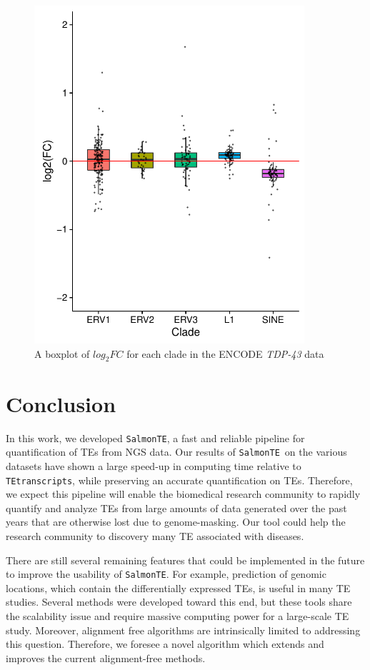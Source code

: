 \documentclass[wsdraft]{ws-procs11x85}
\newcommand{\TEtranscripts}{\texttt{TEtranscripts}}
\newcommand{\SalmonTE}{\texttt{SalmonTE}}
\begin{document}
\begin{figure}[h]
\centerline{
\includegraphics[width=10cm]{boxplot-clade-k562}
}
\caption{A boxplot of $log_{2}FC$ for each clade in the ENCODE \textit{TDP-43} data}
\label{aba:fig5}
\end{figure}

\section{Conclusion}


In this work, we developed \SalmonTE, a fast and reliable pipeline for quantification of TEs from 
NGS data.
Our results of \SalmonTE~on the various datasets have shown a large speed-up in computing time relative to \TEtranscripts, 
while preserving an accurate quantification on TEs. 
Therefore, we expect this pipeline will enable the biomedical research community to rapidly quantify and analyze TEs from large amounts of data generated over the past years that are otherwise lost due to genome-masking. Our tool could help the research community to discovery many TE associated with diseases.

There are still several remaining features that could be implemented in the future to improve the usability of \SalmonTE. 
For example, prediction of genomic locations, which contain the differentially expressed TEs, is useful in many TE studies. Several methods were developed toward this end\cite{de2017identifying,criscione2014transcriptional}, but these tools share the scalability issue and require massive computing power for a large-scale TE study. 
Moreover, alignment free algorithms are intrinsically limited to addressing this question. 
Therefore, we foresee a novel algorithm which extends and improves the current alignment-free methods.
\end{document}
